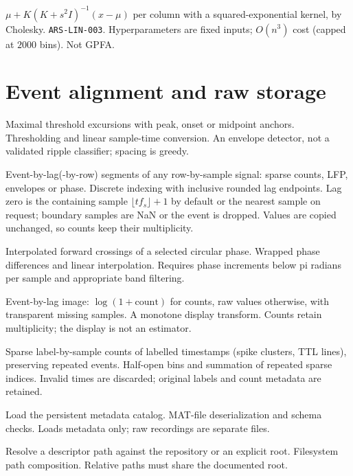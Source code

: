 {$\mu+K(K+s^2I)^{-1}(x-\mu)$ per column with a squared-exponential kernel, by Cholesky.}
{\texttt{ARS-LIN-003}.}
{Hyperparameters are fixed inputs; $O(n^3)$ cost (capped at $2000$ bins). Not GPFA.}

\section{Event alignment and raw storage}

{Maximal threshold excursions with peak, onset or midpoint anchors.}
{Thresholding and linear sample-time conversion.}
{An envelope detector, not a validated ripple classifier; spacing is greedy.}

{Event-by-lag(-by-row) segments of any row-by-sample signal: sparse counts, LFP, envelopes or phase.}
{Discrete indexing with inclusive rounded lag endpoints.}
{Lag zero is the containing sample $\lfloor tf_s\rfloor+1$ by default or the nearest sample on request; boundary samples are NaN or the event is dropped. Values are copied unchanged, so counts keep their multiplicity.}

{Interpolated forward crossings of a selected circular phase.}
{Wrapped phase differences and linear interpolation.}
{Requires phase increments below pi radians per sample and appropriate band filtering.}

{Event-by-lag image: $\log(1+\text{count})$ for counts, raw values otherwise, with transparent missing samples.}
{A monotone display transform.}
{Counts retain multiplicity; the display is not an estimator.}

{Sparse label-by-sample counts of labelled timestamps (spike clusters, TTL lines), preserving repeated events.}
{Half-open bins and summation of repeated sparse indices.}
{Invalid times are discarded; original labels and count metadata are retained.}

{Load the persistent metadata catalog.}
{MAT-file deserialization and schema checks.}
{Loads metadata only; raw recordings are separate files.}

{Resolve a descriptor path against the repository or an explicit root.}
{Filesystem path composition.}
{Relative paths must share the documented root.}

